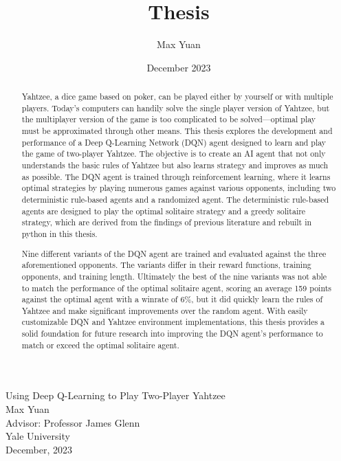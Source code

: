 \documentclass[12pt]{article}
\title{Thesis}
\author{Max Yuan}
\date{December 2023}
\begin{document}
\begin{titlepage}
    \thispagestyle{empty} %
    \centering
    \Huge
    Using Deep Q-Learning to Play Two-Player Yahtzee\\
    \vspace{10mm}
    \Large
    Max Yuan\\
    Advisor: Professor James Glenn\\
    \vspace{10mm}
    Yale University\\
    December, 2023
\end{titlepage}

\newpage
\begin{abstract}
\noindent
Yahtzee, a dice game based on poker, can be played either by yourself or with multiple players. Today's computers can handily solve the single player version of Yahtzee, but the multiplayer version of the game is too complicated to be solved—optimal play must be approximated through other means. This thesis explores the development and performance of a Deep Q-Learning Network (DQN) agent designed to learn and play the game of two-player Yahtzee. The objective is to create an AI agent that not only understands the basic rules of Yahtzee but also learns strategy and improves as much as possible. The DQN agent is trained through reinforcement learning, where it learns optimal strategies by playing numerous games against various opponents, including two deterministic rule-based agents and a randomized agent. The deterministic rule-based agents are designed to play the optimal solitaire strategy and a greedy solitaire strategy, which are derived from the findings of previous literature and rebuilt in python in this thesis.

Nine different variants of the DQN agent are trained and evaluated against the three aforementioned opponents. The variants differ in their reward functions, training opponents, and training length. Ultimately the best of the nine variants was not able to match the performance of the optimal solitaire agent, scoring an average 159 points against the optimal agent with a winrate of 6\%, but it did quickly learn the rules of Yahtzee and make significant improvements over the random agent. With easily customizable DQN and Yahtzee environment implementations, this thesis provides a solid foundation for future research into improving the DQN agent's performance to match or exceed the optimal solitaire agent.
\end{abstract}
\end{document}
